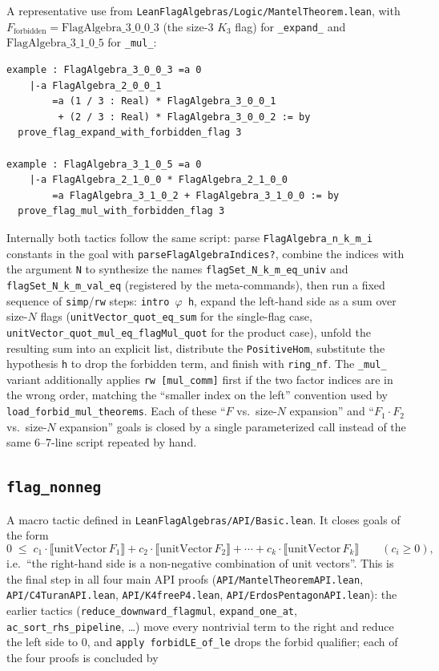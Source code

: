 \documentclass[11pt]{article}
\begin{document}
A representative use from
\texttt{LeanFlagAlgebras/Logic/MantelTheorem.lean}, with
$F_{\text{forbidden}} = \mathrm{FlagAlgebra}\_3\_0\_0\_3$ (the size-$3$
$K_3$ flag) for \texttt{\_expand\_} and
$\mathrm{FlagAlgebra}\_3\_1\_0\_5$ for \texttt{\_mul\_}:

\begin{lstlisting}
example : FlagAlgebra_3_0_0_3 =a 0
    |-a FlagAlgebra_2_0_0_1
        =a (1 / 3 : Real) * FlagAlgebra_3_0_0_1
         + (2 / 3 : Real) * FlagAlgebra_3_0_0_2 := by
  prove_flag_expand_with_forbidden_flag 3

example : FlagAlgebra_3_1_0_5 =a 0
    |-a FlagAlgebra_2_1_0_0 * FlagAlgebra_2_1_0_0
        =a FlagAlgebra_3_1_0_2 + FlagAlgebra_3_1_0_0 := by
  prove_flag_mul_with_forbidden_flag 3
\end{lstlisting}

Internally both tactics follow the same script: parse
\texttt{FlagAlgebra\_n\_k\_m\_i} constants in the goal with
\texttt{parseFlagAlgebraIndices?}, combine the indices with the
argument \texttt{N} to synthesize the names
\texttt{flagSet\_N\_k\_m\_eq\_univ} and
\texttt{flagSet\_N\_k\_m\_val\_eq} (registered by the meta-commands),
then run a fixed sequence of \texttt{simp}/\texttt{rw} steps:
\texttt{intro $\varphi$ h}, expand the left-hand side as a sum over
size-$N$ flags (\texttt{unitVector\_quot\_eq\_sum} for the single-flag
case, \texttt{unitVector\_quot\_mul\_eq\_flagMul\_quot} for the
product case), unfold the resulting sum into an explicit list,
distribute the \texttt{PositiveHom}, substitute the hypothesis
\texttt{h} to drop the forbidden term, and finish with
\texttt{ring\_nf}. The \texttt{\_mul\_} variant additionally applies
\texttt{rw [mul\_comm]} first if the two factor indices are in the
wrong order, matching the ``smaller index on the left'' convention
used by \texttt{load\_forbid\_mul\_theorems}. Each of these
``$F$ vs.\ size-$N$ expansion'' and ``$F_1 \cdot F_2$ vs.\ size-$N$
expansion'' goals is closed by a single parameterized call instead
of the same 6--7-line script repeated by hand.

\subsection{\texttt{flag\_nonneg}}

A macro tactic defined in \texttt{LeanFlagAlgebras/API/Basic.lean}. It
closes goals of the form
\[
   0 \;\le\; c_1 \cdot \llbracket\mathrm{unitVector}\,F_1\rrbracket
   + c_2 \cdot \llbracket\mathrm{unitVector}\,F_2\rrbracket
   + \cdots + c_k \cdot \llbracket\mathrm{unitVector}\,F_k\rrbracket
   \qquad (c_i \ge 0),
\]
i.e.\ ``the right-hand side is a non-negative combination of unit
vectors''. This is the final step in all four main API proofs
(\texttt{API/MantelTheoremAPI.lean}, \texttt{API/C4TuranAPI.lean},
\texttt{API/K4freeP4.lean}, \texttt{API/ErdosPentagonAPI.lean}): the
earlier tactics (\texttt{reduce\_downward\_flagmul},
\texttt{expand\_one\_at}, \texttt{ac\_sort\_rhs\_pipeline}, \ldots)
move every nontrivial term to the right and reduce the left side to
$0$, and \texttt{apply forbidLE\_of\_le} drops the forbid qualifier;
each of the four proofs is concluded by
\end{document}
